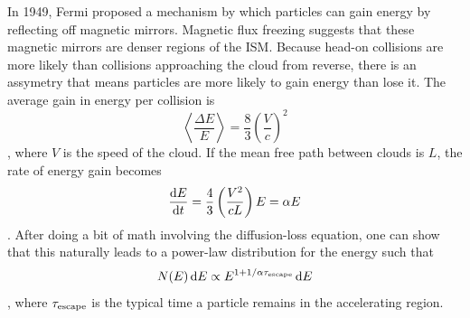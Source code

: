 \begin{enumerate}
\begin{itemize}
            In 1949, Fermi proposed a mechanism by which particles can gain energy by reflecting
            off magnetic mirrors.  Magnetic flux freezing suggests that these magnetic mirrors are denser regions
            of the ISM.  Because head-on collisions are more likely than collisions approaching
            the cloud from reverse, there is an assymetry that means particles are more likely
            to gain energy than lose it.  The average gain in energy per collision is
            \begin{dmath}
                \left\langle\frac{\Delta E}{E}\right\rangle = \frac83\left(\frac{V}{c}\right)^2
            \end{dmath},
            where $V$ is the speed of the cloud.  If the mean free path between clouds is $L$,
            the rate of energy gain becomes
            \begin{dmath}
                \frac{\d E}{\d t} = \frac43 \left(\frac{V^2}{cL}\right) E \nolinebreak
                                  = \alpha E
            \end{dmath}.
            After doing a bit of math involving the diffusion-loss equation, one can show that this naturally leads to a power-law distribution for the
            energy such that
            \begin{dmath}
                N(E)\,\d E \propto E^{1+1/\alpha\tau_{\rm escape}}\,\d E
            \end{dmath},
            where $\tau_{\rm escape}$ is the typical time a particle remains in the accelerating
            region.


\end{itemize}
\end{enumerate}
